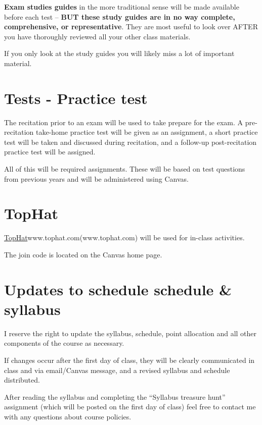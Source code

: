 \documentclass[
]{book}
\begin{document}
\textbf{Exam studies guides} in the more traditional sense will be made available before each test -- \textbf{BUT these study guides are in no way complete, comprehensive, or representative}. They are most useful to look over AFTER you have thoroughly reviewed all your other class materials.

If you only look at the study guides you will likely miss a lot of important material.

\hypertarget{tests---practice-test}{%
\chapter{Tests - Practice test}\label{tests---practice-test}}

The recitation prior to an exam will be used to take prepare for the exam. A pre-recitation take-home practice test will be given as an assignment, a short practice test will be taken and discussed during recitation, and a follow-up post-recitation practice test will be assigned.

All of this will be required assignments. These will be based on test questions from previous years and will be administered using Canvas.

\hypertarget{tophat}{%
\chapter{TopHat}\label{tophat}}

\protect\hyperlink{tophat}{TopHat}www.tophat.com(www.tophat.com) will be used for in-class activities.

The join code is located on the Canvas home page.

\hypertarget{updates-to-schedule-schedule-syllabus}{%
\chapter{Updates to schedule schedule \& syllabus}\label{updates-to-schedule-schedule-syllabus}}

I reserve the right to update the syllabus, schedule, point allocation and all other components of the course as necessary.

If changes occur after the first day of class, they will be clearly communicated in class and via email/Canvas message, and a revised syllabus and schedule distributed.

After reading the syllabus and completing the ``Syllabus treasure hunt'' assignment (which will be posted on the first day of class) feel free to contact me with any questions about course policies.

  
\end{document}
